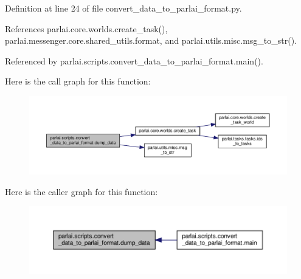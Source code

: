 Definition at line 24 of file convert\+\_\+data\+\_\+to\+\_\+parlai\+\_\+format.\+py.



References parlai.\+core.\+worlds.\+create\+\_\+task(), parlai.\+messenger.\+core.\+shared\+\_\+utils.\+format, and parlai.\+utils.\+misc.\+msg\+\_\+to\+\_\+str().



Referenced by parlai.\+scripts.\+convert\+\_\+data\+\_\+to\+\_\+parlai\+\_\+format.\+main().

Here is the call graph for this function\+:
\nopagebreak
\begin{figure}[H]
\begin{center}
\leavevmode
\includegraphics[width=350pt]{namespaceparlai_1_1scripts_1_1convert__data__to__parlai__format_a4ed2278a6a86b341d814edbef295124c_cgraph}
\end{center}
\end{figure}
Here is the caller graph for this function\+:
\nopagebreak
\begin{figure}[H]
\begin{center}
\leavevmode
\includegraphics[width=350pt]{namespaceparlai_1_1scripts_1_1convert__data__to__parlai__format_a4ed2278a6a86b341d814edbef295124c_icgraph}
\end{center}
\end{figure}
\mbox{\label{namespaceparlai_1_1scripts_1_1convert__data__to__parlai__format_a1cdf007fb0ed5951c0dfb135500d47cd}} 
